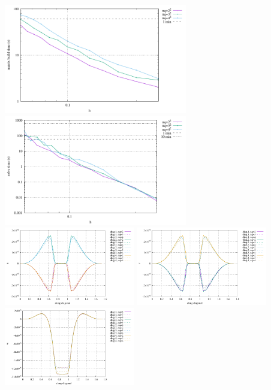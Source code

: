 \begin{center}
\includegraphics[width=8cm]{python_codes/fieldstone_82/RESULTS/bench3/build.pdf}
\includegraphics[width=8cm]{python_codes/fieldstone_82/RESULTS/bench3/solve.pdf}\\
\includegraphics[width=5.7cm]{python_codes/fieldstone_82/RESULTS/bench3/diags_u.pdf}
\includegraphics[width=5.7cm]{python_codes/fieldstone_82/RESULTS/bench3/diags_v.pdf}
\includegraphics[width=5.7cm]{python_codes/fieldstone_82/RESULTS/bench3/diags_w.pdf}\\

\end{center}
